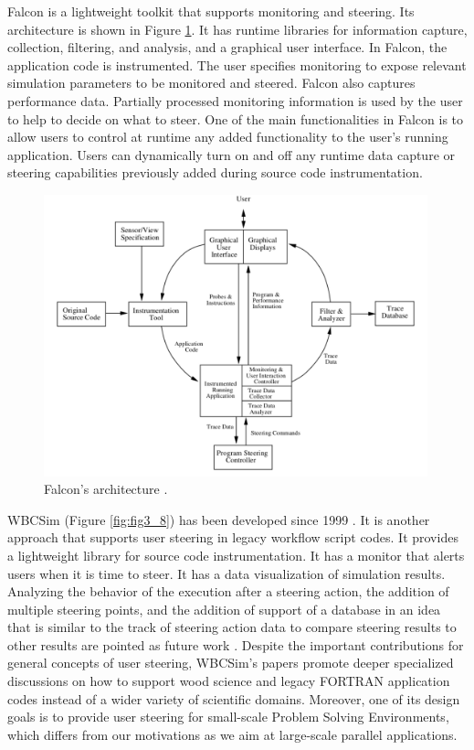 Falcon \cite{Gu1995Falcon:}
is a lightweight toolkit that supports monitoring and steering. Its architecture is shown in Figure \ref{fig:fig3_7}. It has
runtime libraries for information capture, collection, filtering, and
analysis, and a graphical user interface. In Falcon, the application
code is instrumented. The user specifies monitoring to expose relevant
simulation parameters to be monitored and steered. Falcon also captures
performance data. Partially processed monitoring information is used by
the user to help to decide on what to steer. One of the main
functionalities in Falcon is to allow users to control at runtime any
added functionality to the user's running application. Users can
dynamically turn on and off any runtime data capture or steering
capabilities previously added during source code instrumentation.

\begin{figure}[H]
    \centering
    \includegraphics[width=420px,keepaspectratio]{img/media/image17.png}
    \caption{Falcon's architecture \cite{Gu1995Falcon:}.}
    \label{fig:fig3_7}
\end{figure}


WBCSim (Figure \ref{fig:fig3_8}) has been developed since 1999
\cite{Goel1999WBCSim:}.
It is another approach that supports user steering in legacy
workflow script codes. It provides a lightweight library for source code
instrumentation. It has a monitor that alerts users when it is time to
steer. It has a data visualization of simulation results. Analyzing the
behavior of the execution after a steering action, the addition of multiple
steering points, and the addition of support of a database in an idea that
is similar to the track of steering action data to compare steering
results to other results are pointed as future work
\cite{Shu2011Computational}.
Despite the important contributions for general concepts of
user steering, WBCSim's papers
\cite{Goel1999WBCSim:,Shu2011Computational,Shu2006WBCSim:}
promote deeper specialized discussions on how to support wood science
and legacy FORTRAN application codes instead of a wider variety of
scientific domains. Moreover, one of its design goals is to provide
user steering for small-scale Problem Solving
Environments, which differs from our motivations as we aim at
large-scale parallel applications.

